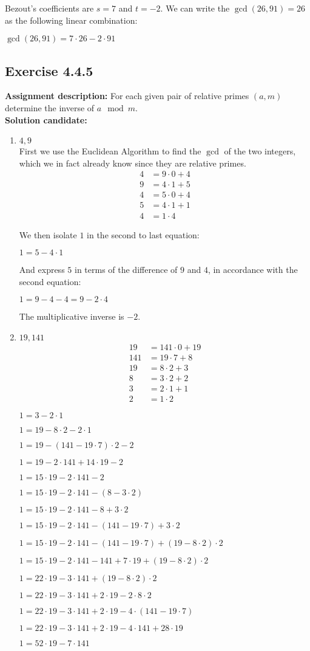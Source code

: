 \documentclass{report}
\newcommand{\cent}[1]{\begin{center}#1\end{center}}
\newcommand{\mAlign}[1]{\begin{align*}#1\end{align*}}
\newcommand{\AssignmentDescription}{\textbf{Assignment description: }}
\newcommand{\Solution}{\textbf{Solution candidate: }}
\newcommand{\Exercise}[1]{\subsection{Exercise #1}}
\newcommand{\defaultEnumerateLabel}{\textbf{\alph*.}}
\newcommand{\MyItem}[1]{\item #1\\}
\begin{document}
\begin{enumerate}[label=\defaultEnumerateLabel]
	Bezout's coefficients are $s=7$ and $t=-2$. We can write the $\gcd(26,91) = 26$ as the following linear combination:
	
	\cent{$\gcd(26,91) = 7 \cdot 26 - 2 \cdot 91$}
	
	
	
	\Exercise{4.4.5}
	
	\AssignmentDescription
	For each given pair of relative primes $(a,m)$ determine the inverse of $a \mod m$.\\
	
	\Solution
	
	\begin{enumerate}[label=\defaultEnumerateLabel]
		\MyItem{$4,9$}
		First we use the Euclidean Algorithm to find the $\gcd$ of the two integers, which we in fact already know since they are relative primes.
		\mAlign{
			4 &= 9 \cdot 0 + 4 \\
			9 &= 4 \cdot 1 + 5 \\
			4 &= 5 \cdot 0 +4 \\
			5 &= 4 \cdot 1 + 1 \\
			4 &= 1 \cdot 4
		}
	
		We then isolate $1$ in the second to last equation:
		
		\cent{$1 = 5 - 4 \cdot 1$}
		
		And express $5$ in terms of the difference of $9$ and $4$, in accordance with the second equation:
		
		\cent{$1 = 9-4 - 4= 9 -2 \cdot 4$}
		
		The multiplicative inverse is $-2$.\\
		
		\MyItem{$19,141$}
		
		\mAlign{
			19 &= 141 \cdot 0 + 19 \\
			141 &= 19 \cdot 7 + 8 \\
			19 &= 8 \cdot 2 + 3 \\
			8 &= 3 \cdot 2 + 2 \\
			3 &= 2 \cdot 1 + 1 \\
			2 &= 1 \cdot 2 
		}
		
		\cent{$1 = 3 - 2 \cdot 1$}
		
		\cent{$1 = 19 - 8 \cdot 2 - 2 \cdot 1$}
		
		\cent{$1 = 19 - (141 - 19 \cdot 7) \cdot 2 - 2$}
		\cent{$1 = 19 - 2 \cdot 141 + 14 \cdot 19 - 2$}
		\cent{$1 = 15 \cdot 19 - 2 \cdot 141 - 2$}
		\cent{$1 = 15 \cdot 19 - 2 \cdot 141 - (8- 3 \cdot 2)$}
		\cent{$1 = 15 \cdot 19 - 2 \cdot 141 - 8 + 3 \cdot 2$}
		\cent{$1 = 15 \cdot 19 - 2 \cdot 141 - (141 - 19 \cdot 7) + 3 \cdot 2$}
		\cent{$1 = 15 \cdot 19 - 2 \cdot 141 - (141 - 19 \cdot 7) + (19 - 8 \cdot 2) \cdot 2$}
		\cent{$1 = 15 \cdot 19 - 2 \cdot 141 - 141 +  7 \cdot 19 + (19 - 8 \cdot 2) \cdot 2$}
		\cent{$1 = 22 \cdot 19 - 3 \cdot 141 +   (19 - 8 \cdot 2) \cdot 2$}
		\cent{$1 = 22 \cdot 19 - 3 \cdot 141 +  2 \cdot 19 - 2 \cdot 8 \cdot 2 $}
		\cent{$1 = 22 \cdot 19 - 3 \cdot 141 +  2 \cdot 19 - 4 \cdot (141 - 19 \cdot 7) $}
		\cent{$1 = 22 \cdot 19 - 3 \cdot 141 +  2 \cdot 19 - 4 \cdot 141 + 28 \cdot 19 $}
		\cent{$1 = 52 \cdot 19 - 7 \cdot 141 $}
		

\end{enumerate}
\end{enumerate}
\end{document}

